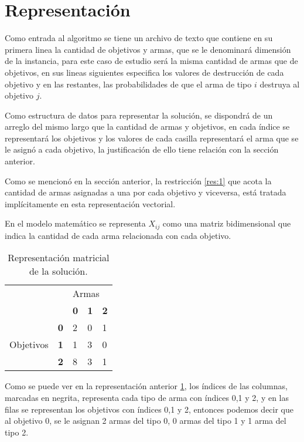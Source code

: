 \section{Representación}

Como entrada al algoritmo se tiene un archivo de texto que contiene en su primera linea la cantidad de objetivos y armas, que se le denominará dimensión de la instancia, para este caso de estudio será la misma cantidad de armas que de objetivos, en sus lineas siguientes especifica los valores de destrucción de cada objetivo y en las restantes, las probabilidades de que el arma de tipo $i$ destruya al objetivo $j$.

Como estructura de datos para representar la solución, se dispondrá de un arreglo del mismo largo que la cantidad de armas y objetivos, en cada índice se representará los objetivos y los valores de cada casilla representará el arma que se le asignó a cada objetivo, la justificación de ello tiene relación con la sección anterior.

Como se mencionó en la sección anterior, la restricción \ref{res:1} que acota la cantidad de armas asignadas a una por cada objetivo y viceversa, está tratada implícitamente en esta representación vectorial.

En el modelo matemático se representa $X_{ij}$ como una matriz bidimensional que indica la cantidad de cada arma relacionada con cada objetivo.

    \begin{table}[h!]
    \centering
    \begin{tabular}{ll|lll|}
    \cline{3-5}
     &  & \multicolumn{3}{l|}{Armas} \\ \cline{3-5} 
     &  & \multicolumn{1}{l|}{\textbf{0}} & \multicolumn{1}{l|}{\textbf{1}} & \textbf{2} \\ \hline
    \multicolumn{1}{|l|}{\multirow{3}{*}{Objetivos}} & \textbf{0} & 2 & 0 & 1 \\ \cline{2-2}
    \multicolumn{1}{|l|}{} & \textbf{1} & 1 & 3 & 0 \\ \cline{2-2}
    \multicolumn{1}{|l|}{} & \textbf{2} & 8 & 3 & 1 \\ \hline
    \end{tabular}
    \caption{Representación matricial de la solución.}
    \label{fig:rep_sol_matrix}
    \end{table}
    
Como se puede ver en la representación anterior \ref{fig:rep_sol_matrix}, los índices de las columnas, marcadas en negrita, representa cada tipo de arma con índices 0,1 y 2, y en las filas se representan los objetivos con índices 0,1 y 2, entonces podemos decir que al objetivo 0, se le asignan 2 armas del tipo 0, 0 armas del tipo 1 y 1 arma del tipo 2.

